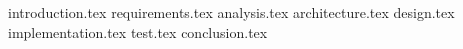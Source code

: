 

{introduction.tex}
{requirements.tex}
{analysis.tex}
{architecture.tex}
{design.tex}
{implementation.tex}
{test.tex}
{conclusion.tex}

%
